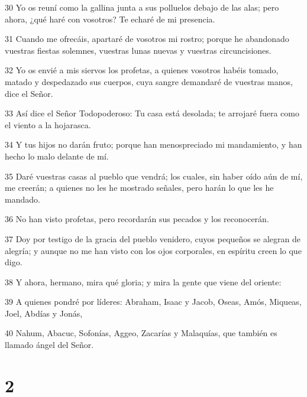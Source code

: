 \par 30 Yo os reuní como la gallina junta a sus polluelos debajo de las alas; pero ahora, ¿qué haré con vosotros? Te echaré de mi presencia.
\par 31 Cuando me ofrecáis, apartaré de vosotros mi rostro; porque he abandonado vuestras fiestas solemnes, vuestras lunas nuevas y vuestras circuncisiones.
\par 32 Yo os envié a mis siervos los profetas, a quienes vosotros habéis tomado, matado y despedazado sus cuerpos, cuya sangre demandaré de vuestras manos, dice el Señor.
\par 33 Así dice el Señor Todopoderoso: Tu casa está desolada; te arrojaré fuera como el viento a la hojarasca.
\par 34 Y tus hijos no darán fruto; porque han menospreciado mi mandamiento, y han hecho lo malo delante de mí.
\par 35 Daré vuestras casas al pueblo que vendrá; los cuales, sin haber oído aún de mí, me creerán; a quienes no les he mostrado señales, pero harán lo que les he mandado.
\par 36 No han visto profetas, pero recordarán sus pecados y los reconocerán.
\par 37 Doy por testigo de la gracia del pueblo venidero, cuyos pequeños se alegran de alegría; y aunque no me han visto con los ojos corporales, en espíritu creen lo que digo.
\par 38 Y ahora, hermano, mira qué gloria; y mira la gente que viene del oriente:
\par 39 A quienes pondré por líderes: Abraham, Isaac y Jacob, Oseas, Amós, Miqueas, Joel, Abdías y Jonás,
\par 40 Nahum, Abacuc, Sofonías, Aggeo, Zacarías y Malaquías, que también es llamado ángel del Señor.

\chapter{2}

